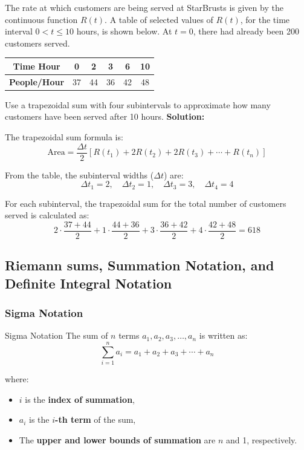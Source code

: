 \documentclass[12pt]{article}
\theoremstyle{beautifulthm}
\begin{document}
\begin{tcolorbox}[colback=examplebg, colframe=red!75!black, title=\textbf{EXAMPLE 4: Trapezoid Rule}, fonttitle=\bfseries, sharp corners]



The rate at which customers are being served at StarBrusts is given by the continuous function \( R(t) \). A table of selected values of \( R(t) \), for the time interval \( 0 < t \leq 10 \) hours, is shown below. At \( t = 0 \), there had already been 200 customers served.

\begin{center}
\begin{tabular}{|c|c|c|c|c|c|}
\hline
\textbf{Time Hour} & 0 & 2 & 3 & 6 & 10 \\
\hline
\textbf{People/Hour} & 37 & 44 & 36 & 42 & 48\\
\hline
\end{tabular}
\end{center}

Use a trapezoidal sum with four subintervals to approximate how many customers have been served after 10 hours.
\tcblower
\textbf{Solution:} 

The trapezoidal sum formula is:
\[
\text{Area} = \frac{\Delta t}{2} \left[ R(t_1) + 2R(t_2) + 2R(t_3) + \cdots + R(t_n) \right]
\]

From the table, the subinterval widths (\( \Delta t \)) are:
\[
\Delta t_1 = 2, \quad \Delta t_2 = 1, \quad \Delta t_3 = 3, \quad \Delta t_4 = 4
\]

For each subinterval, the trapezoidal sum for the total number of customers served is calculated as:
\[
2 \cdot \frac{37 + 44}{2} + 1 \cdot \frac{44 + 36}{2} + 3 \cdot \frac{36 + 42}{2} + 4 \cdot \frac{42 + 48}{2} =618
\]
\end{tcolorbox}


\subsection{Riemann sums, Summation Notation, and Definite Integral Notation}

\subsubsection{Sigma Notation}
\begin{Definition}{Sigma Notation}{}
    The sum of \( n \) terms \( a_1, a_2, a_3, \dots, a_n \) is written as:
\[
\sum_{i=1}^{n} a_i = a_1 + a_2 + a_3 + \cdots + a_n
\]

\noindent where:
\begin{itemize}
    \item \( i \) is the \textbf{index of summation},
    \item \( a_i \) is the \textbf{\( i \)-th term} of the sum,
    \item The \textbf{upper and lower bounds of summation} are \( n \) and 1, respectively.
\end{itemize}
\end{Definition}
\end{document}
